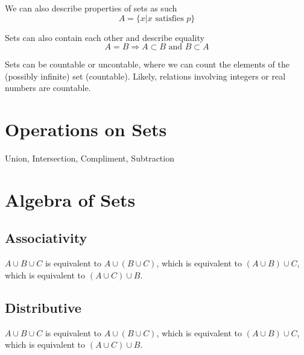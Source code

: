 \documentclass[12pt]{book}
\begin{document}
We can also describe properties of sets as such
$$A = \{ x | x \text{ satisfies } p\}$$

Sets can also contain each other and describe equality
$$A = B \Rightarrow A \subset B \text{ and } B \subset A$$

Sets can be countable or uncontable, where we can count the elements
of the (possibly infinite) set (countable). Likely, relations
involving integers or real numbers are countable.

\section{Operations on Sets}
Union, Intersection, Compliment, Subtraction

\section{Algebra of Sets}
\subsection{Associativity}
$A \cup B \cup C$ is equivalent to $A \cup (B \cup C)$, which is
equivalent to $(A \cup B) \cup C$, which is equivalent to $(A \cup C)
\cup B$.
\subsection{Distributive}
$A \cup B \cup C$ is equivalent to $A \cup (B \cup C)$, which is
equivalent to $(A \cup B) \cup C$, which is equivalent to $(A \cup C)
\cup B$.

\printglossaries
\end{document}
